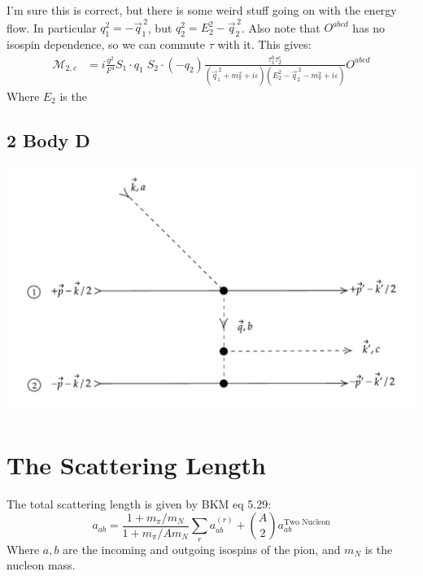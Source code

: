 \documentclass[11pt]{article}
\newcommand\mm{\mathcal{M}}
\newcommand{\sq}{^{\,2}}
\begin{document}
I'm sure this is correct, but there is some weird stuff going on with the energy flow.
In particular $q_1^2 =-\vec{q}_1\sq$, but $q_2^2=E_2^2 - \vec{q}_2\sq$.
Also note that $O^{abcd}$ has no isospin dependence, so we can commute $\tau$ with it. This gives:
\begin{align}
    \mm_{2,c}&=i \frac{g^2}{F^4} S_1 \cdot q_1\; S_2 \cdot(-q_2) 
    \frac{\tau_1^b \tau_2^c}{
        (\vec{q}_1\sq +m_\pi^2 + i \varepsilon)
        (E_2^2-\vec{q}_2\sq-m_\pi^2 + i \varepsilon)
    }
    O^{abcd}
\end{align}
Where $E_2$ is the 
\subsection{2 Body D}
\begin{center}
    \includegraphics[scale=0.6]{2d.pdf}
\end{center}
\section{The Scattering Length}
The total scattering length is given by BKM eq 5.29:
\begin{equation}
    a_{ab}= \frac{1+ m_\pi/m_N}{1+m_\pi/Am_N}  \sum_r a^{(r)}_{ab} + \binom{A}{2} a^{\text{Two Nucleon}}_{ab}
\end{equation}
Where $a,b$ are the incoming and outgoing isospins of the pion, and $m_N$ is the nucleon mass.
\end{document}
